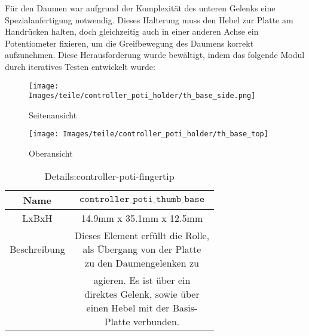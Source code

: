 Für den Daumen war aufgrund der Komplexität des unteren Gelenks eine Spezialanfertigung notwendig. 
Dieses Halterung muss den Hebel zur Platte am Handrücken halten, doch gleichzeitig auch in einer anderen Achse ein Potentiometer fixieren, um die Greifbewegung des Daumens korrekt aufzunehmen. 
Diese Herausforderung wurde bewältigt, indem das folgende Modul durch iteratives Testen entwickelt wurde:
\begin{minipage}{0.5\textwidth}
    \begin{figure}[H]
        \texttt{[image: Images/teile/controller\_poti\_holder/th\_base\_side.png]}
        \centering
        \caption{Seitenansicht}
    \end{figure}
\end{minipage}
\begin{minipage}{0.5\textwidth}
    \begin{figure}[H]
        \texttt{[image: Images/teile/controller\_poti\_holder/th\_base\_top]}
        \centering
        \caption{Oberansicht}
    \end{figure}
\end{minipage}
\begin{minipage}{0.6\textwidth}
    \begin{table}[H]
        \centering
        \begin{tabular}{|c|c|}
            \hline
            Name&$\texttt{controller}\_ \texttt{poti}\_\texttt{thumb}\_\texttt{base}$\\
            \hline
            LxBxH&14.9mm x 35.1mm x 12.5mm\\
            \hline
            Beschreibung&\shortstack{Dieses Element erfüllt die Rolle, \\als Übergang von der Platte\\zu den Daumengelenken zu}\\
            &\shortstack{agieren. Es ist über ein\\direktes Gelenk, sowie über\\einen Hebel mit der Basis-\\Platte verbunden.}\\
            \hline
        \end{tabular} 
        \caption{Details:controller-poti-fingertip}
        \label{tab:th_base}
    \end{table}
\end{minipage}